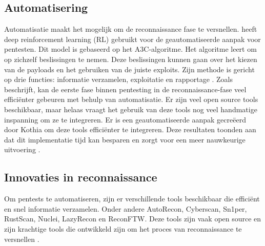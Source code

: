\subsection{Automatisering}
Automatisatie maakt het mogelijk om de reconnaissance fase te versnellen. 
\textcite{Hoang} heeft deep reinforcement learning (RL) gebruikt voor de geautomatiseerde aanpak voor pentesten. 
Dit model is gebaseerd op het A3C-algoritme. Het algoritme leert om op zichzelf beslissingen te nemen.
Deze beslissingen kunnen gaan over het kiezen van de payloads en het gebruiken van de juiste exploits. 
Zijn methode is gericht op drie functies: informatie verzamelen, exploitatie en rapportage \autocite{Hoang}.
Zoals \textcite{Kothia} beschrijft, kan de eerste fase binnen pentesting in de reconnaissance-fase veel efficiënter gebeuren met behulp van automatisatie. 
Er zijn veel open source tools beschikbaar, maar helaas vraagt het gebruik van deze tools nog veel handmatige inspanning om ze te integreren.
Er is een geautomatiseerde aanpak gecreëerd door Kothia om deze tools efficiënter te integreren. 
Deze resultaten toonden aan dat dit implementatie tijd kan besparen en zorgt voor een meer nauwkeurige uitvoering \autocite{Kothia}.

\subsection{Innovaties in reconnaissance}
Om pentests te automatiseren, zijn er verschillende tools beschikbaar die efficiënt en snel informatie verzamelen. 
Onder andere AutoRecon, Cyberscan, Sn1per, RustScan, Nuclei, LazyRecon en ReconFTW. Deze tools zijn vaak open source en zijn krachtige tools die ontwikkeld zijn om het proces van reconnaissance te versnellen \autocite{Shebli} .

